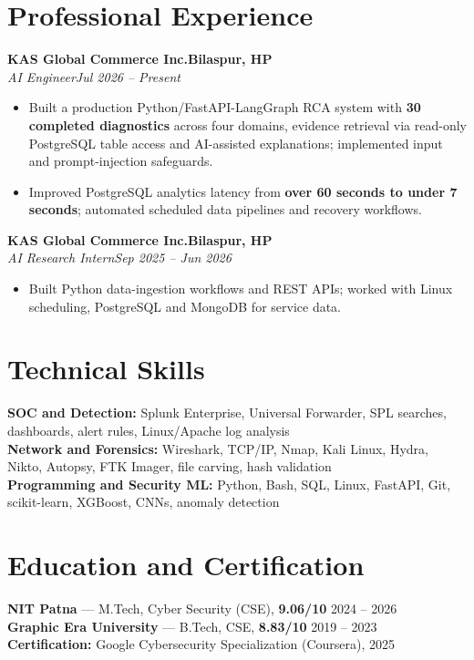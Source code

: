\documentclass[a4paper,11pt]{article}
\newcommand{\position}[4]{\textbf{#1}\hfill\textbf{#2}\\[-1pt]\textit{#3}\hfill\textit{#4}\vspace{-3pt}}
\newenvironment{tightbullets}{\begin{itemize}[leftmargin=1.25em,label=\textbullet,topsep=2pt,itemsep=2pt,parsep=0pt,partopsep=0pt]}{\end{itemize}\vspace{-4pt}}
\newcommand{\skill}[2]{\textbf{#1:} #2\\[1pt]}
\begin{document}
\section{Professional Experience}
\position{KAS Global Commerce Inc.}{Bilaspur, HP}{AI Engineer}{Jul 2026 -- Present}
\begin{tightbullets}
\item Built a production Python/FastAPI-LangGraph RCA system with \textbf{30 completed diagnostics} across four domains, evidence retrieval via read-only PostgreSQL table access and AI-assisted explanations; implemented input and prompt-injection safeguards.
\item Improved PostgreSQL analytics latency from \textbf{over 60 seconds to under 7 seconds}; automated scheduled data pipelines and recovery workflows.
\end{tightbullets}
\vspace{1pt}
\position{KAS Global Commerce Inc.}{Bilaspur, HP}{AI Research Intern}{Sep 2025 -- Jun 2026}
\begin{tightbullets}
\item Built Python data-ingestion workflows and REST APIs; worked with Linux scheduling, PostgreSQL and MongoDB for service data.
\end{tightbullets}

\section{Technical Skills}
{\small
\skill{SOC and Detection}{Splunk Enterprise, Universal Forwarder, SPL searches, dashboards, alert rules, Linux/Apache log analysis}
\skill{Network and Forensics}{Wireshark, TCP/IP, Nmap, Kali Linux, Hydra, Nikto, Autopsy, FTK Imager, file carving, hash validation}
\skill{Programming and Security ML}{Python, Bash, SQL, Linux, FastAPI, Git, scikit-learn, XGBoost, CNNs, anomaly detection}
}
\section{Education and Certification}
{\small\textbf{NIT Patna} --- M.Tech, Cyber Security (CSE), \textbf{9.06/10} \hfill 2024 -- 2026\\[1pt]
\textbf{Graphic Era University} --- B.Tech, CSE, \textbf{8.83/10} \hfill 2019 -- 2023\\[1pt]
\textbf{Certification:} Google Cybersecurity Specialization (Coursera), 2025}
\end{document}
